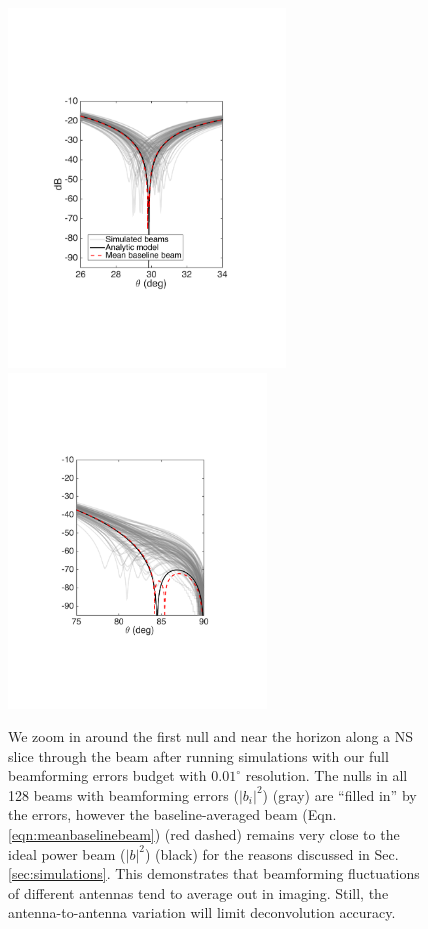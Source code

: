 \begin{figure}[h]
\centering
\includegraphics[width=2.9in]{chap2_beamforming_errors/test_beam_averaging_zoom1.pdf}
\includegraphics[width=2.7in]{chap2_beamforming_errors/test_beam_averaging_zoom2.pdf}
\caption[Zoom in around the first null and near the horizon along a NS slice through the beam in full beamforming errors simulations.]{We zoom in around the first null and near the horizon along a NS slice through the beam after running simulations with our full beamforming errors budget with $0.01^\circ$ resolution. The nulls in all 128 beams with beamforming errors ($|b_i|^2$) (gray) are ``filled in'' by the errors, however the baseline-averaged beam (Eqn. \ref{eqn:meanbaselinebeam}) (red dashed) remains very close to the ideal power beam ($|b|^2$) (black) for the reasons discussed in Sec. \ref{sec:simulations}. This demonstrates that beamforming fluctuations of different antennas tend to average out in imaging. Still, the antenna-to-antenna variation will limit deconvolution accuracy.}
\label{fig:sidelobeaveraging}
\end{figure}


